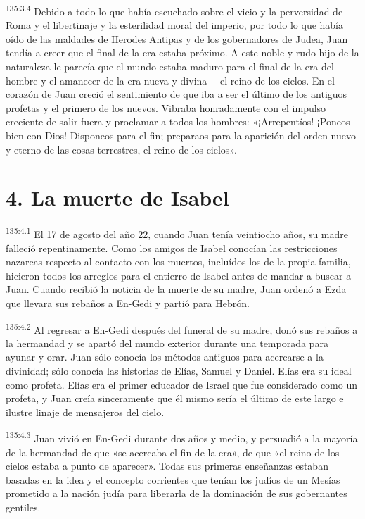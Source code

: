 \par
\textsuperscript{135:3.4} Debido a todo lo que había escuchado sobre el vicio y la perversidad de Roma y el libertinaje y la esterilidad moral del imperio, por todo lo que había oído de las maldades de Herodes Antipas y de los gobernadores de Judea, Juan tendía a creer que el final de la era estaba próximo. A este noble y rudo hijo de la naturaleza le parecía que el mundo estaba maduro para el final de la era del hombre y el amanecer de la era nueva y divina ---el reino de los cielos. En el corazón de Juan creció el sentimiento de que iba a ser el último de los antiguos profetas y el primero de los nuevos. Vibraba honradamente con el impulso creciente de salir fuera y proclamar a todos los hombres: «¡Arrepentíos! ¡Poneos bien con Dios! Disponeos para el fin; preparaos para la aparición del orden nuevo y eterno de las cosas terrestres, el reino de los cielos».

\section*{4. La muerte de Isabel}
\par
\textsuperscript{135:4.1} El 17 de agosto del año 22, cuando Juan tenía veintiocho años, su madre falleció repentinamente. Como los amigos de Isabel conocían las restricciones nazareas respecto al contacto con los muertos, incluídos los de la propia familia, hicieron todos los arreglos para el entierro de Isabel antes de mandar a buscar a Juan. Cuando recibió la noticia de la muerte de su madre, Juan ordenó a Ezda que llevara sus rebaños a En-Gedi y partió para Hebrón.

\par
\textsuperscript{135:4.2} Al regresar a En-Gedi después del funeral de su madre, donó sus rebaños a la hermandad y se apartó del mundo exterior durante una temporada para ayunar y orar. Juan sólo conocía los métodos antiguos para acercarse a la divinidad; sólo conocía las historias de Elías, Samuel y Daniel. Elías era su ideal como profeta. Elías era el primer educador de Israel que fue considerado como un profeta, y Juan creía sinceramente que él mismo sería el último de este largo e ilustre linaje de mensajeros del cielo.

\par
\textsuperscript{135:4.3} Juan vivió en En-Gedi durante dos años y medio, y persuadió a la mayoría de la hermandad de que «se acercaba el fin de la era», de que «el reino de los cielos estaba a punto de aparecer». Todas sus primeras enseñanzas estaban basadas en la idea y el concepto corrientes que tenían los judíos de un Mesías prometido a la nación judía para liberarla de la dominación de sus gobernantes gentiles.

